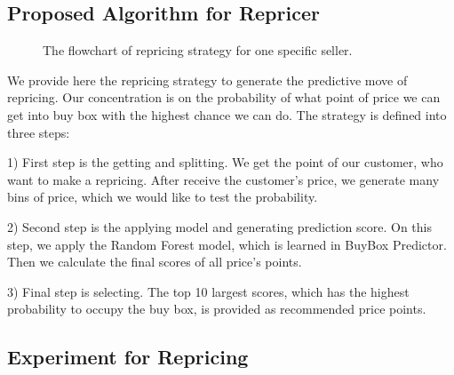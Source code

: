 \subsection{Proposed Algorithm for Repricer}
\label{sec:repricermodel}


\begin{figure}[!h]
	\begin{center}
	\end{center}
	\caption{\label{fig:repricerflow}The flowchart of repricing strategy for one specific seller.
	}
\end{figure}

We provide here the repricing strategy to generate the predictive move of repricing. Our concentration is on the probability of what point of price we can get into buy box with the highest chance we can do. The strategy is defined into three steps:

1) First step is the getting and splitting. We get the point of our customer, who want to make a repricing.
After receive the customer's price, we generate many bins of price, which we would like to test the probability. 

2) Second step is the applying model and generating prediction score. On this step, we apply the Random Forest model, which is learned in BuyBox Predictor. Then we calculate the final scores of all price's points.

3) Final step is selecting. The top 10 largest scores, which has the highest probability to occupy the buy box, is provided as recommended price points. 


\subsection{Experiment for Repricing}
\label{sec:exprepricer}



